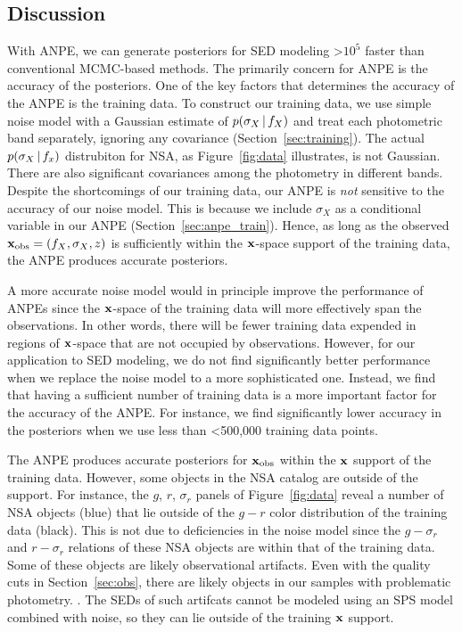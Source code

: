 \subsection{Discussion} \label{sec:discuss}
With ANPE, we can generate posteriors for SED modeling >$10^5$ faster than
conventional MCMC-based methods. 
The primarily concern for ANPE is the accuracy of the posteriors.
One of the key factors that determines the accuracy of the ANPE is the training
data.  
To construct our training data, we use simple noise model with a Gaussian
estimate of $p(\sigma_X\,|\, f_X)$ and treat each photometric band separately,
ignoring any covariance (Section~\ref{sec:training}). 
The actual $p(\sigma_X\,|\, f_x)$ distrubiton for NSA, as
Figure~\ref{fig:data} illustrates, is not Gaussian. 
There are also significant covariances among the photometry in different bands.
Despite the shortcomings of our training data, our ANPE is \emph{not}
sensitive to the accuracy of our noise model. 
This is because we include $\sigma_X$ as a conditional variable in our ANPE 
(Section~\ref{sec:anpe_train}).
Hence, as long as the observed ${\bf x}_{\rm obs} = (f_X, \sigma_X, z)$ is
sufficiently within the ${\bf x}$-space support of the training data, the ANPE
produces accurate posteriors. 

A more accurate noise model would in principle improve the performance of ANPEs
since the ${\bf x}$-space of the training data will more effectively span the
observations. 
In other words, there will be fewer training data expended in regions of 
${\bf x}$-space that are not occupied by observations.  
However, for our application to SED modeling, we do not find significantly  
better performance when we replace the noise model to a more sophisticated one.
Instead, we find that having a sufficient number of training data is a more
important factor for the accuracy of the ANPE. 
For instance, we find significantly lower accuracy in the posteriors when we
use less than <500,000 training data points. 

The ANPE produces accurate posteriors for ${\bf x}_{\rm obs}$ within the 
${\bf x}$ support of the training data. 
However, some objects in the NSA catalog are outside of the support. 
For instance, the $g$, $r$, $\sigma_r$ panels of Figure~\ref{fig:data} reveal a
number of NSA objects (blue) that lie outside of the $g-r$ color distribution
of the training data (black). 
This is not due to deficiencies in the noise model since the $g-\sigma_r$ and
$r-\sigma_r$ relations of these NSA objects are within that of the training 
data. 
Some of these objects are likely observational artifacts. 
Even with the quality cuts in Section~\ref{sec:obs}, there are likely objects
in our samples with problematic photometry.  
. 
The SEDs of such artifcats cannot be modeled using an SPS model combined with
noise, so they can lie outside of the training ${\bf x}$ support.

